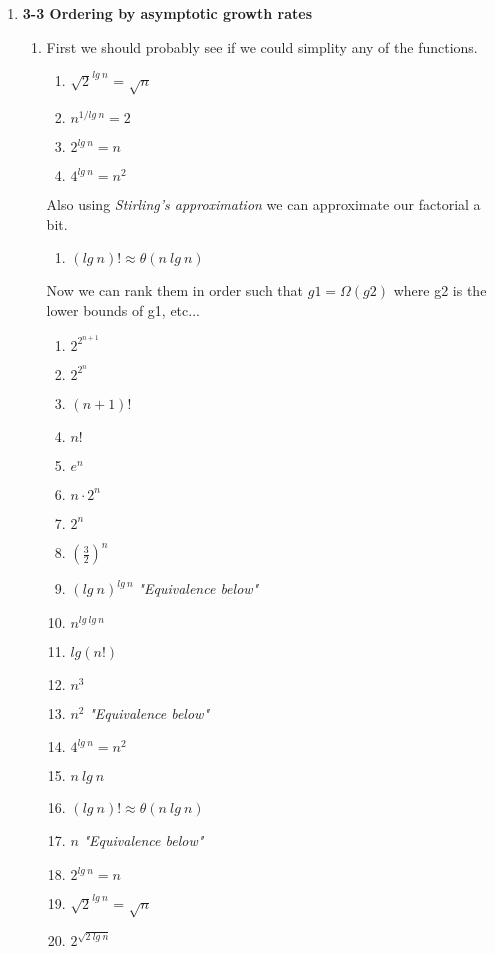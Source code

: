 \documentclass{article}
\begin{document}
\begin{enumerate}
    \item \textbf{3-3 Ordering by asymptotic growth rates}
    \begin{enumerate}
      \item First we should probably see if we could simplity any of the functions.
      \begin{enumerate}
        \item $\sqrt{2}^{lg\:n}$ = $\sqrt{n}$
        \item $n^{1/lg\:n} = 2$
        \item $2^{lg\:n} = n$
        \item $4^{lg\:n} = n^2$
      \end{enumerate}
      Also using \textit{Stirling's approximation} we can approximate our factorial a bit.
      \begin{enumerate}
        \item $(lg\:n)! \approx \theta(n\:lg\:n)$
      \end{enumerate}
      Now we can rank them in order such that $g1 = \Omega{(g2)}$ where g2 is the lower bounds of g1, etc...
      \begin{enumerate}
        \item $2^{2^{n+1}}$
        \item $2^{2^n}$
        \item $(n+1)!$ 
        \item $n!$
        \item $e^n$
        \item $n \cdot 2^n$
        \item $2^n$
        \item $(\frac{3}{2})^n$
        \item $(lg\:n)^{lg\:n}$ \textit{"Equivalence below"}
        \item $n^{lg\:lg\:n}$
        \item $lg(n!)$
        \item $n^3$
        \item $n^2$ \textit{"Equivalence below"}
        \item $4^{lg\:n} = n^2$
        \item $n\:lg\:n$
        \item $(lg\:n)! \approx \theta(n\:lg\:n)$
        \item $n$ \textit{"Equivalence below"}
        \item $2^{lg\:n} = n$
        \item $\sqrt{2}^{lg\:n}$ = $\sqrt{n}$
        \item $2^{\sqrt{2\:lg\:n}}$

\end{enumerate}
\end{enumerate}
\end{enumerate}
\end{document}

